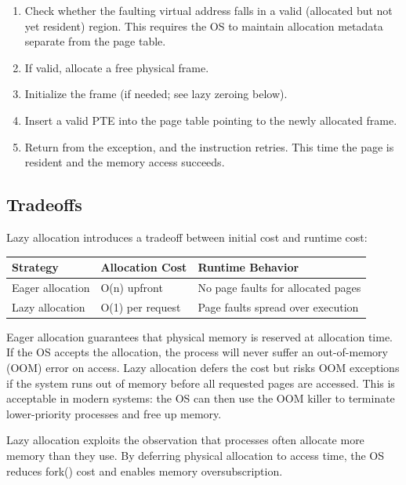 \documentclass[11pt]{article}
\begin{document}
\begin{enumerate}
    \item Check whether the faulting virtual address falls in a valid (allocated but not yet resident) region. This requires the OS to maintain allocation metadata separate from the page table.
    \item If valid, allocate a free physical frame.
    \item Initialize the frame (if needed; see lazy zeroing below).
    \item Insert a valid PTE into the page table pointing to the newly allocated frame.
    \item Return from the exception, and the instruction retries. This time the page is resident and the memory access succeeds.
\end{enumerate}

\subsection{Tradeoffs}

Lazy allocation introduces a tradeoff between initial cost and runtime cost:

\begin{center}
\begin{tabular}{lll}
\toprule
\textbf{Strategy} & \textbf{Allocation Cost} & \textbf{Runtime Behavior} \\
\midrule
Eager allocation & O(n) upfront & No page faults for allocated pages \\
Lazy allocation & O(1) per request & Page faults spread over execution \\
\bottomrule
\end{tabular}
\end{center}

Eager allocation guarantees that physical memory is reserved at allocation time. If the OS accepts the allocation, the process will never suffer an out-of-memory (OOM) error on access. Lazy allocation defers the cost but risks OOM exceptions if the system runs out of memory before all requested pages are accessed. This is acceptable in modern systems: the OS can then use the OOM killer to terminate lower-priority processes and free up memory.

\begin{keyidea}
Lazy allocation exploits the observation that processes often allocate more memory than they use. By deferring physical allocation to access time, the OS reduces fork() cost and enables memory oversubscription.
\end{keyidea}
\end{document}
